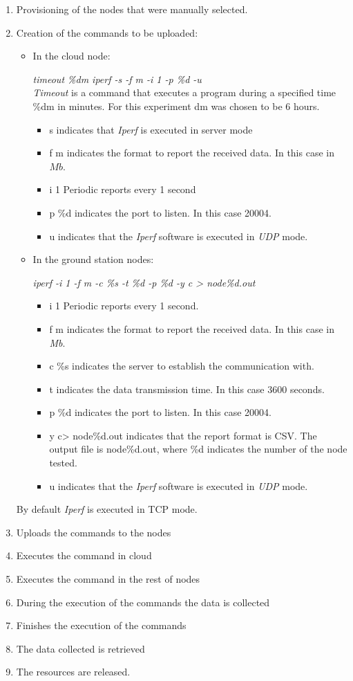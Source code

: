 \begin{enumerate}
\item Provisioning of the nodes that were manually selected.
\item Creation of the commands to be uploaded:
\begin{itemize}
\item In the cloud node:

\emph{timeout \%dm iperf -s -f m -i 1 -p \%d -u} \\
\emph{Timeout} is a command that executes a program during a specified time \%dm in
minutes. For this experiment dm was chosen to be 6 hours.%
\begin{itemize}
\item s indicates that \emph{Iperf} is executed in server mode
\item f m indicates the format to report the received data. In this case in $Mb$.
\item i 1 Periodic reports every 1 second
\item p \%d indicates the port to listen. In this case 20004.
\item u indicates that the \emph{Iperf} software is executed in \emph{UDP} mode.
\end{itemize}

\item In the ground station nodes:

\emph{iperf  -i 1 -f m -c \%s -t \%d -p \%d  -y c > node\%d.out}\\
\begin{itemize}
\item i 1 Periodic reports every 1 second.
\item f m indicates the format to report the received data. In this case in \emph{Mb}.
\item c \%s indicates the server to establish the communication with.
\item t indicates the data transmission time. In this case 3600 seconds.
\item p \%d indicates the port to listen. In this case 20004.
\item y c> node\%d.out indicates that the report format is \ac{CSV}. The output file
  is node\%d.out, where \%d indicates the number of the node tested.
\item u indicates that the \emph{Iperf} software is executed in \emph{UDP} mode.
\end{itemize}
\end{itemize}

By default \emph{Iperf} is executed in \ac{TCP} mode.

\item Uploads the commands to the nodes
\item Executes the command in cloud
\item Executes the command in the rest of nodes
\item During the execution of the commands the data is collected
\item Finishes the execution of the commands
\item The data collected is retrieved
\item The resources are released.
\end{enumerate}

